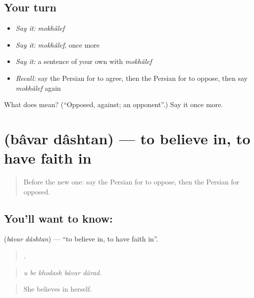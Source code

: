 \subsection*{Your turn}
\begin{itemize}
\raggedright
  \item \emph{Say it:} \emph{mokhâlef}
  \item \emph{Say it:} \emph{mokhâlef}, once more
  \item \emph{Say it:} a sentence of your own with \emph{mokhâlef}
  \item \emph{Recall:} say the Persian for to agree, then the Persian for to oppose, then say \emph{mokhâlef} again
\end{itemize}

\begin{tcolorbox}[breakable,colback=teal!4,colframe=teal!35!black,title={Before you move on}]
What does  mean? (\textquotedblleft{}Opposed, against; an opponent\textquotedblright{}.) Say it once more.
\end{tcolorbox}
\section[\texorpdfstring{\fa{باور} \fa{داشتن} (bâvar dâshtan)}{باور داشتن (bâvar dâshtan)}]{  (bâvar dâshtan) — to believe in, to have faith in}

\label{lesson:FA-C361-bavar-dashtan}



\begin{quote}
Before the new one: say the Persian for to oppose, then the Persian for opposed.
\end{quote}

\subsection*{You'll want to know:  }
\textbf{ } (\emph{bâvar dâshtan}) — \textquotedblleft{}to believe in, to have faith in\textquotedblright{}.

\begin{quote}
    .
\end{quote}

\begin{quote}
\emph{u be khodash bâvar dârad.}
\end{quote}

\begin{quote}
She believes in herself.
\end{quote}

